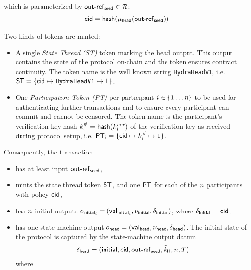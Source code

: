 which is parameterized
by $\mathsf{out\textsf{-}{}ref}_{\mathsf{seed}} \in \mathcal{R}$:
\[
  \mathsf{cid} = \mathsf{hash}(\mu_\mathsf{head}(\mathsf{out\textsf{-}{}ref}_{\mathsf{seed}}))
\]

\noindent Two kinds of tokens are minted:
\begin{itemize}
  \item A single \emph{State Thread (ST)} token marking the head output. This
        output contains the state of the protocol on-chain and the token ensures
        contract continuity. The token name is the well known string
        \texttt{HydraHeadV1}, i.e.
        $\mathsf{ST} = \{\mathsf{cid} \mapsto \texttt{HydraHeadV1} \mapsto 1\}$.
  \item One \emph{Participation Token (PT)} per participant
        $i \in \{1 \dots n \}$ to be used for authenticating further
        transactions and to ensure every participant can commit and cannot be
        censored. The token name is the participant's verification key hash
        $k^{\#}_{i} = \mathsf{hash}(k^{ver}_{i})$ of the verification key as received
        during protocol setup, i.e.
        $\mathsf{PT}_{i} = \{\mathsf{cid} \mapsto k^{\#}_{i} \mapsto 1\}$.
\end{itemize}

\noindent Consequently, the \mtxInit{} transaction

\begin{samepage}
\begin{itemize}
  \item has at least input $\mathsf{out\textsf{-}{}ref}_{\mathsf{seed}}$,
  \item mints the state thread token $\mathsf{ST}$, and one $\mathsf{PT}$ for each of the $n$
        participants with policy $\mathsf{cid}$,
  \item has $n$ initial outputs
        $o_{\mathsf{initial}_{i}} = (\mathsf{val}_{\mathsf{initial}_{i}}, \nu_{\mathsf{initial}}, \delta_{\mathsf{initial}_{}})$,
        where $\delta_{\mathsf{initial}_{}} = \mathsf{cid}$,
  \item has one state-machine output
        $o_{\mathsf{head}} = (\mathsf{val}_{\mathsf{head}}, \nu_\mathsf{head}, \delta_{\mathsf{head}})$. The initial state
        of the protocol is captured by the state-machine output datum
        \[
          \delta_{\mathsf{head}} = (\mathsf{initial},\mathsf{cid},\mathsf{out\textsf{-}{}ref}_{\mathsf{seed}},\tilde{k}_{\mathsf{H}},n,T)
        \]
        where
\end{itemize}
\end{samepage}

